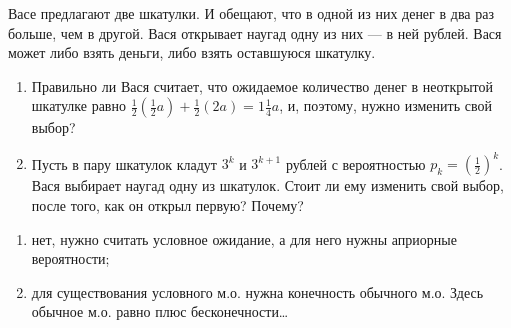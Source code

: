 \begin{problem}\par
\begin{source}
\cite{binmore:fg}
\end{source}
Васе предлагают две шкатулки. И обещают, что в одной из них денег в два раз больше, чем в другой. Вася открывает наугад одну из них --- в ней  рублей. Вася может либо взять деньги, либо взять оставшуюся шкатулку.
\begin{enumerate}
\item Правильно ли Вася считает, что ожидаемое количество денег в неоткрытой шкатулке равно  $\frac{1}{2} \left(\frac{1}{2} a\right)+\frac{1}{2} \left(2a\right)=1\frac{1}{4} a$, и, поэтому, нужно изменить свой выбор?\par
\item Пусть в пару шкатулок кладут  $3^{k} $  и  $3^{k+1} $  рублей с вероятностью  $p_{k} =\left(\frac{1}{2} \right)^{k} $. Вася выбирает наугад одну из шкатулок. Стоит ли ему изменить свой выбор, после того, как он открыл первую? Почему?\par
\end{enumerate}


\begin{sol}
\begin{enumerate}
\item
 нет, нужно считать условное ожидание, а для него нужны априорные вероятности;
 \item для существования условного м.о. нужна конечность обычного м.о. Здесь обычное м.о. равно плюс бесконечности\ldots
\end{enumerate}
\end{sol}
\end{problem}



